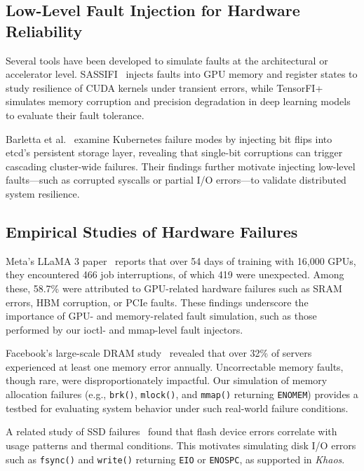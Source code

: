 \subsection{Low-Level Fault Injection for Hardware Reliability}

Several tools have been developed to simulate faults at the architectural or accelerator level. SASSIFI~\cite{sassifi2017} injects faults into GPU memory and register states to study resilience of CUDA kernels under transient errors, while TensorFI+~\cite{tensorfi2022} simulates memory corruption and precision degradation in deep learning models to evaluate their fault tolerance.

Barletta et al.~\cite{mutiny2024} examine Kubernetes failure modes by injecting bit flips into etcd's persistent storage layer, revealing that single-bit corruptions can trigger cascading cluster-wide failures. Their findings further motivate injecting low-level faults—such as corrupted syscalls or partial I/O errors—to validate distributed system resilience.

\subsection{Empirical Studies of Hardware Failures}

Meta's LLaMA 3 paper~\cite{llama3herdmodels} reports that over 54 days of training with 16,000 GPUs, they encountered 466 job interruptions, of which 419 were unexpected. Among these, 58.7\% were attributed to GPU-related hardware failures such as SRAM errors, HBM corruption, or PCIe faults. These findings underscore the importance of GPU- and memory-related fault simulation, such as those performed by our ioctl- and mmap-level fault injectors.

Facebook's large-scale DRAM study~\cite{facebookdramstudy} revealed that over 32\% of servers experienced at least one memory error annually. Uncorrectable memory faults, though rare, were disproportionately impactful. Our simulation of memory allocation failures (e.g., \texttt{brk()}, \texttt{mlock()}, and \texttt{mmap()} returning \texttt{ENOMEM}) provides a testbed for evaluating system behavior under such real-world failure conditions.

A related study of SSD failures~\cite{facebookssdstudy} found that flash device errors correlate with usage patterns and thermal conditions. This motivates simulating disk I/O errors such as \texttt{fsync()} and \texttt{write()} returning \texttt{EIO} or \texttt{ENOSPC}, as supported in \textit{Khaos}.

